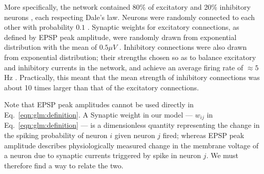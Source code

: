 More specifically, the network contained 80\% of excitatory and 20\% inhibitory neurons \cite{Braitenberg1998,Urquijo2000}, each respecting Dale's law. Neurons were randomly connected to each other with probability $0.1$ \cite{Braitenberg1998,Lefort2009}. Synaptic weights for excitatory connections, as defined by EPSP peak amplitude, were randomly drawn from exponential distribution with the mean of $0.5 \mu V$ \cite{Lefort2009,Sayer1990}. Inhibitory connections were also drawn from exponential distribution; their strengths chosen so as to balance excitatory and inhibitory currents in the network, and achieve an average firing rate of $\approx 5 $ Hz \cite{Abeles01}. Practically, this meant that the mean strength of inhibitory connections was about 10 times larger than that of the excitatory connections.

Note that EPSP peak amplitudes cannot be used directly in Eq.~\eqref{eqn:glm:definition}. A Synaptic weight in our model --- $w_{ij}$ in Eq.~\eqref{eqn:glm:definition} --- is a dimensionless quantity representing the change in the spiking probability of neuron $i$ given neuron $j$ fired; whereas EPSP peak amplitude describes physiologically measured change in the membrane voltage of a neuron due to synaptic currents triggered by spike in neuron $j$. We must therefore find a way to relate the two.

